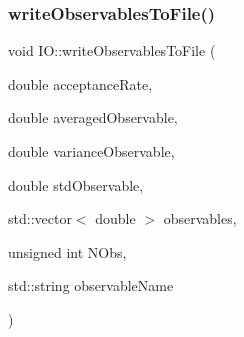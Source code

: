 \subsubsection{\texorpdfstring{writeObservablesToFile()}{writeObservablesToFile()}}
{\footnotesize\ttfamily void I\+O\+::write\+Observables\+To\+File (\begin{DoxyParamCaption}\item[{double}]{acceptance\+Rate,  }\item[{double}]{averaged\+Observable,  }\item[{double}]{variance\+Observable,  }\item[{double}]{std\+Observable,  }\item[{std\+::vector$<$ double $>$}]{observables,  }\item[{unsigned int}]{N\+Obs,  }\item[{std\+::string}]{observable\+Name }\end{DoxyParamCaption})}

